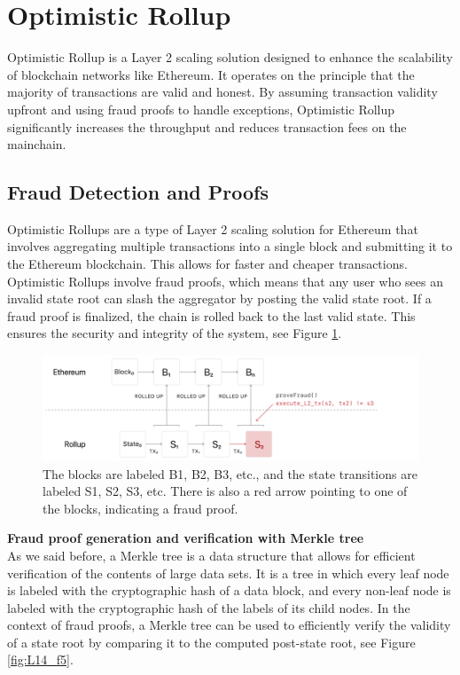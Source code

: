 \section{Optimistic Rollup}
Optimistic Rollup is a Layer 2 scaling solution designed to enhance the scalability of blockchain networks like Ethereum. It operates on the principle that the majority of transactions are valid and honest. By assuming transaction validity upfront and using fraud proofs to handle exceptions, Optimistic Rollup significantly increases the throughput and reduces transaction fees on the mainchain.
\subsection{Fraud Detection and Proofs}
Optimistic Rollups are a type of Layer 2 scaling solution for Ethereum that involves aggregating multiple transactions into a single block and submitting it to the Ethereum blockchain. This allows for faster and cheaper transactions.\\
Optimistic Rollups involve fraud proofs, which means that any user who sees an invalid state root can slash the aggregator by posting the valid state root. If a fraud proof is finalized, the chain is rolled back to the last valid state. This ensures the security and integrity of the system, see Figure \ref{fig:L14_f4}.\\
\begin{center}
	\begin{figure}
		\centering
		\includegraphics[width=0.8\linewidth]{Fig/14/F4}
		\caption{The blocks are labeled B1, B2, B3, etc., and the state transitions are labeled S1, S2, S3, etc. There is also a red arrow pointing to one of the blocks, indicating a fraud proof.
		}
		\label{fig:L14_f4}
	\end{figure}
\end{center}
\textbf{Fraud proof generation and verification with Merkle tree}\\ As we said before, a Merkle tree is a data structure that allows for efficient verification of the contents of large data sets. It is a tree in which every leaf node is labeled with the cryptographic hash of a data block, and every non-leaf node is labeled with the cryptographic hash of the labels of its child nodes. In the context of fraud proofs, a Merkle tree can be used to efficiently verify the validity of a state root by comparing it to the computed post-state root, see Figure \ref{fig:L14_f5}.
